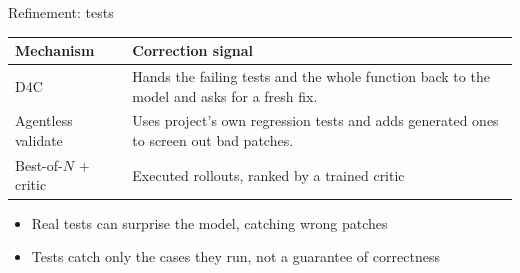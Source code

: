 \documentclass[
  aspectratio=169,
  font=times,
  sectionpage=true,
]{tumbeamer}
\newcommand{\pro}{\item[\textcolor{TUMGreen}{\textbf{+}}]}
\newcommand{\con}{\item[\textcolor{TUMExtRed}{\textbf{--}}]}
\newenvironment{tradeoffs}
  {\small\begin{itemize}\setlength{\itemsep}{0.3em}}
  {\end{itemize}}
\begin{document}
\begin{frame}{Refinement: tests}
  \label{fr:refine2}
  \small
  \begin{tabular}{@{}L{0.30\textwidth}L{0.60\textwidth}@{}}
    \toprule
    \textbf{Mechanism} & \textbf{Correction signal} \\
    \midrule
    D4C~\cite{xu2024d4c}
      & Hands the failing tests and the whole function back to the model and asks for a fresh fix. \\
    \addlinespace
    Agentless validate~\cite{xia2024agentless}
      & Uses project's own regression tests and adds generated ones to screen out bad patches. \\
    \addlinespace
    Best-of-$N$ $+$ critic~\cite{openhands2025verified}
      & Executed rollouts, ranked by a trained critic \\
      \bottomrule
  \end{tabular}

  \smallskip
  \begin{tradeoffs}
    \pro Real tests can surprise the model, catching wrong patches
    \con Tests catch only the cases they run, not a guarantee of correctness
  \end{tradeoffs}
\end{frame}

\end{document}
